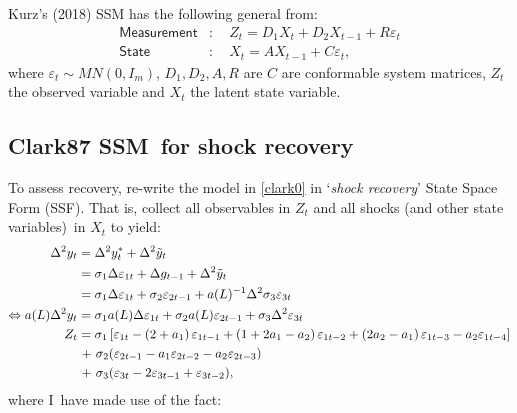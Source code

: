 \documentclass[a4paper,12pt]{article}
\newcommand{\bsq}{\begin{subequations}}\newcommand{\esq}{\end{subequations}}
\begin{document}
Kurz's (2018) SSM has the following general from:\bsq\label{SSM}%
\begin{align}
\mathsf{Measurement}& :\quad Z_{t}=D_{1}X_{t}+D_{2}X_{t-1}+R\varepsilon _{t}
\label{ssm1} \\
\mathsf{State}& :\quad X_{t}=AX_{t-1}+C\varepsilon _{t},  \label{ssm2}
\end{align}%
\esq where $\varepsilon _{t}\sim MN(0,I_{m})$, $D_{1},D_{2},A,R$ are $C$ are
conformable system matrices, $Z_{t}$ the observed variable and $X_{t}$ the
latent state variable.

\subsection{Clark87 SSM\ for shock recovery}

To assess recovery, re-write the model in \ref{clark0} in `\emph{shock
recovery}' State Space Form (SSF). That is, collect all observables in $%
Z_{t} $ and all shocks (and other state variables)\ in $X_{t}$ to yield:%
\begin{align}
\Delta ^{2}y_{t}& =\Delta ^{2}y_{t}^{\ast }+\Delta ^{2}\tilde{y}_{t}  \notag
\label{Z} \\
& =\sigma _{1}\Delta \varepsilon _{1t}+\Delta g_{t-1}+\Delta ^{2}\tilde{y}%
_{t}  \notag \\
& =\sigma _{1}\Delta \varepsilon _{1t}+\sigma _{2}\varepsilon
_{2t-1}+a(L)^{-1}\Delta ^{2}\sigma _{3}\varepsilon _{3t}  \notag \\
\Leftrightarrow a(L)\Delta ^{2}y_{t}& =\sigma _{1}a(L)\Delta \varepsilon
_{1t}+\sigma _{2}a(L)\varepsilon _{2t-1}+\sigma _{3}\Delta ^{2}\varepsilon
_{3t}  \notag \\
Z_{t}& =\sigma _{1}\left[ \varepsilon _{1t}-\left( 2+a_{1}\right)
\varepsilon _{1t-1}+\left( 1+2a_{1}-a_{2}\right) \varepsilon _{1t-2}+\left(
2a_{2}-a_{1}\right) \varepsilon _{1t-3}-a_{2}\varepsilon _{1t-4}\right] 
\notag \\
& \hspace{1pt}+\hspace{1pt}\sigma _{2}(\varepsilon _{2t-1}-a_{1}\varepsilon
_{2t-2}-a_{2}\varepsilon _{2t-3}) \\
& \hspace{1pt}+\hspace{1pt}\sigma _{3}(\varepsilon _{3t}-2\varepsilon
_{3t-1}+\varepsilon _{3t-2}),  \notag
\end{align}%
where I\ have made use of the fact: 
\end{document}

